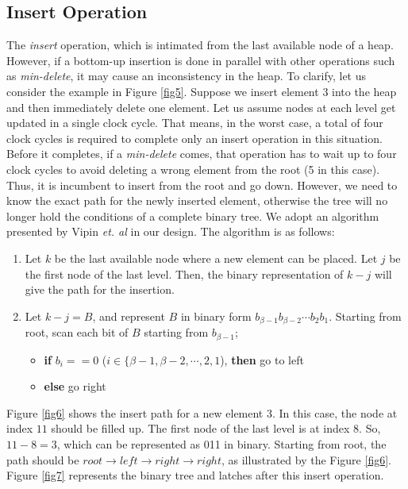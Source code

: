 \subsection{Insert Operation}

The {\it insert} operation, which is intimated from the last available node of a heap.
However, if a bottom-up insertion is done in parallel with other operations such as {\it min-delete}, it may cause an inconsistency in the heap.
To clarify, let us consider the example in Figure \ref{fig5}.
Suppose we insert element $3$ into the heap and then immediately delete one element.
Let us assume nodes at each level get updated in a single clock cycle.
That means, in the worst case, a total of four clock cycles is required to complete only an insert operation in this situation.
Before it completes, if a {\it min-delete} comes, that operation has to wait up to four clock cycles to avoid deleting a wrong element from the root (5 in this case).
Thus, it is incumbent to insert from the root and go down.
However, we need to know the exact path for the newly inserted element, otherwise the tree will no longer hold the conditions of a complete binary tree.
We adopt an algorithm presented by Vipin {\it et. al} \cite{pq6} in our design. The algorithm is as follows:

\begin{enumerate}
\item Let $k$ be the last available node where a new element can be placed. Let $j$ be the first node of the last level. Then, the binary representation of $k-j$ will give the path for the insertion.
\item Let $k-j = B$, and represent $B$ in binary form $b_{\beta-1}b_{\beta-2} \cdots b_2b_1$. Starting from root, scan each bit of $B$ starting from $b_{\beta-1}$;
    \begin{itemize}
    \item {\bf if} $b_i == 0$ ($i \in \{\beta-1,\beta-2, \cdots, 2,1$), {\bf then} go to left
    \item {\bf else} go right
    \end{itemize}
\end{enumerate}

Figure \ref{fig6} shows the insert path for a new element $3$. In this case, the node at index $11$ should be filled up.
The first node of the last level is at index $8$.
So, $11 - 8 = 3$, which can be represented as 011 in binary.
Starting from root, the path should be $root \rightarrow left \rightarrow right \rightarrow right$, as illustrated by the Figure \ref{fig6}. Figure \ref{fig7} represents the binary tree and latches after this insert operation.

